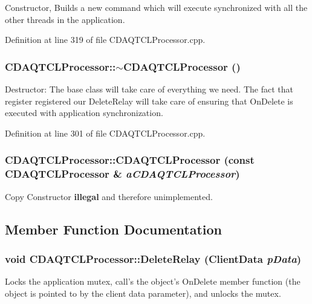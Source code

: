 Constructor, Builds a new command which will execute synchronized with all the other threads in the application. 

Definition at line 319 of file CDAQTCLProcessor.cpp.
\subsubsection{\setlength{\rightskip}{0pt plus 5cm}CDAQTCLProcessor::$\sim$CDAQTCLProcessor ()}\label{classCDAQTCLProcessor_a2}


Destructor: The base class will take care of everything we need. The fact that register registered our Delete\-Relay will take care of ensuring that On\-Delete is executed with application synchronization. 

Definition at line 301 of file CDAQTCLProcessor.cpp.
\subsubsection{\setlength{\rightskip}{0pt plus 5cm}CDAQTCLProcessor::CDAQTCLProcessor (const CDAQTCLProcessor \& {\em a\-CDAQTCLProcessor})\hspace{0.3cm}{\tt  [private]}}\label{classCDAQTCLProcessor_c0}


Copy Constructor {\bf illegal} and therefore unimplemented.



\subsection{Member Function Documentation}
\subsubsection{\setlength{\rightskip}{0pt plus 5cm}void CDAQTCLProcessor::Delete\-Relay (Client\-Data {\em p\-Data})\hspace{0.3cm}{\tt  [static, private]}}\label{classCDAQTCLProcessor_f1}


Locks the application mutex, call's the object's On\-Delete member function (the object is pointed to by the client data parameter), and unlocks the mutex. 

